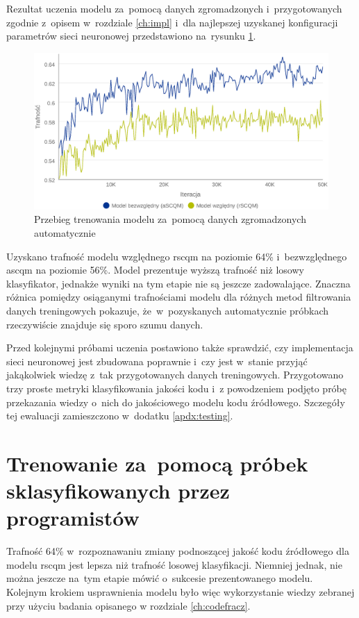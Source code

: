 \documentclass[twoside]{praca}
\begin{document}
Rezultat uczenia modelu za~pomocą danych zgromadzonych i~przygotowanych zgodnie z~opisem w~rozdziale \ref{ch:impl} i~dla najlepszej uzyskanej konfiguracji parametrów sieci neuronowej przedstawiono na~rysunku \ref{fig:learn:diffacc}.

\begin{figure}[h]
\centering
\includegraphics[width=\textwidth]{learn/diffacc.eps}
\caption{Przebieg trenowania modelu za~pomocą danych zgromadzonych automatycznie}
\label{fig:learn:diffacc}
\end{figure}

Uzyskano trafność modelu względnego \gls{rscqm} na poziomie 64\% i~bezwzględnego \gls{ascqm} na poziomie 56\%. Model prezentuje wyższą trafność niż losowy klasyfikator, jednakże wyniki na tym etapie nie są jeszcze zadowalające. Znaczna różnica pomiędzy osiąganymi trafnościami modelu dla różnych metod filtrowania danych treningowych pokazuje, że~w~pozyskanych automatycznie próbkach rzeczywiście znajduje się sporo szumu danych.

Przed kolejnymi próbami uczenia postawiono także sprawdzić, czy implementacja sieci neuronowej jest zbudowana poprawnie i~czy jest w~stanie przyjąć jakąkolwiek wiedzę z~tak przygotowanych danych treningowych. Przygotowano trzy proste metryki klasyfikowania jakości kodu i~z powodzeniem podjęto próbę przekazania wiedzy o~nich do jakościowego modelu kodu źródłowego. Szczegóły tej ewaluacji zamieszczono w~dodatku \ref{apdx:testing}.


\section{Trenowanie za~pomocą próbek sklasyfikowanych przez programistów}
\label{sec:learn:expert}

Trafność 64\% w~rozpoznawaniu zmiany podnoszącej jakość kodu źródłowego dla modelu \gls{rscqm} jest lepsza niż trafność losowej klasyfikacji. Niemniej jednak, nie można jeszcze na~tym etapie mówić o~sukcesie prezentowanego modelu. Kolejnym krokiem usprawnienia modelu było więc wykorzystanie wiedzy zebranej przy użyciu badania opisanego w rozdziale \ref{ch:codefracz}.
\end{document}
